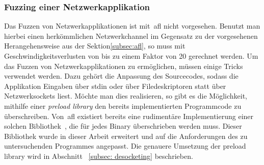 \subsubsection{Fuzzing einer Netzwerkapplikation}\label{subsubsec:fuzzing-netzwerk-app}
Das Fuzzen von Netzwerkapplikationen ist mit~\gls{afl} nicht vorgesehen.
Benutzt man hierbei einen herkömmlichen Netzwerkchannel im Gegensatz zu der vorgesehenen Herangehensweise aus der Sektion\ref{subsec:afl},
so muss mit Geschwindigkeitsverlusten von bis zu einem Faktor von 20 gerechnet werden.
Um das Fuzzen von Netzwerkapplikationen zu ermöglichen, müssen einige Tricks verwendet werden.
Dazu gehört die Anpassung des Sourcecodes, sodass die Applikation Eingaben über stdin oder über Filedeskriptoren statt über Netzwerksockets liest.
\linebreak
Möchte man dies realisieren, so gibt es die Möglichkeit, mithilfe einer \textit{preload library} den bereits
implementierten Programmcode zu überschreiben.
Von~\gls{afl} existiert bereits eine rudimentäre Implementierung einer solchen Bibliothek~\cite{afl-best-practice}, die für jedes Binary
überschrieben werden muss.
Dieser Bibliothek wurde in dieser Arbeit erweitert und auf die Anforderungen des zu untersuchenden Programmes
angepasst.
Die genauere Umsetzung der preload library wird in Abschnitt ~\ref{subsec: desocketing} beschrieben.